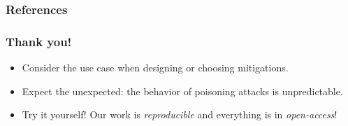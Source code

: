 \documentclass[color,t,presentation,english,aspectratio=169]{beamer}
\begin{document}
\begin{frame}[allowframebreaks]
	\frametitle{References}
	\printbibliography
\end{frame}

\begin{frame}
	\frametitle{Thank you!}
	\vspace{1ex}

	\begin{itemize}
		\item Consider the use case when designing or choosing mitigations.
		\item Expect the unexpected: the behavior of poisoning attacks is unpredictable.
		\item Try it yourself! Our work is \emph{reproducible} and everything is in \emph{open-access}!
	\end{itemize}\vspace{2ex}


\end{frame}
\end{document}

